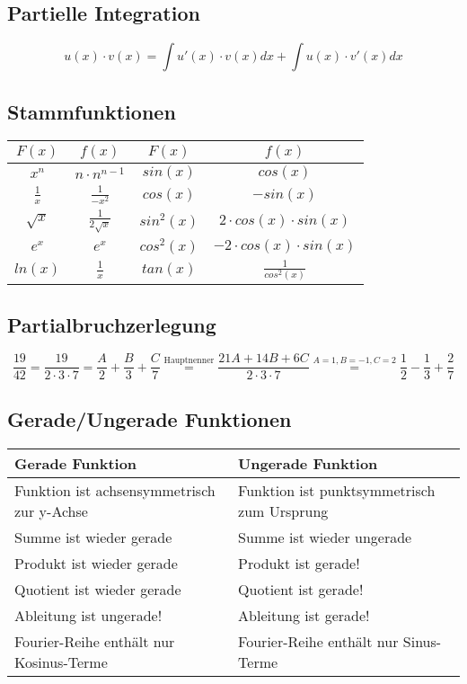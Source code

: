 \documentclass[12pt]{article}
\begin{document}
\subsection{Partielle Integration}
\begin{equation*}
	u(x)\cdot v(x) = \int u'(x) \cdot v(x) dx + \int u(x) \cdot v'(x) dx
\end{equation*}
\subsection{Stammfunktionen}
\begin{table}[H]
	\centering
	\begin{tabular}{|c|c||c|c|}
		\hline
		$F(x)$ & $f(x)$ & $F(x)$ & $f(x)$\\\hline\hline
		$x^n$ & $n\cdot n^{n-1}$ & $sin(x)$ & $cos(x)$\\\hline
		$\frac{1}{x}$ & $\frac{1}{-x^2}$ & $cos(x)$ & $-sin(x)$\\\hline
		$\sqrt{x}$ & $\frac{1}{2\sqrt{x}}$ & $sin^2(x)$ & $2\cdot cos(x)\cdot sin(x)$\\\hline
		$e^x$ & $e^x$ & $cos^2(x)$ & $-2\cdot cos(x)\cdot sin(x)$  \\\hline
		$ln(x)$ & $\frac{1}{x}$ & $tan(x)$ & $\frac{1}{cos^2(x)}$\\\hline
	\end{tabular}
\end{table}
\subsection{Partialbruchzerlegung}
\begin{equation*}
	\frac{19}{42}=\frac{19}{2\cdot3\cdot7}=\frac{A}{2}+\frac{B}{3}+\frac{C}{7}\stackrel{\text{Hauptnenner}}{=}\frac{21A+14B+6C}{2\cdot3\cdot7}\stackrel{A=1,B=-1,C=2}{=}\frac{1}{2}-\frac{1}{3}+\frac{2}{7}
\end{equation*}
\subsection{Gerade/Ungerade Funktionen}
\begin{table}[H]
	\centering
	\begin{tabular}{|l|l|}
		\hline
		\textbf{Gerade Funktion} & \textbf{Ungerade Funktion}\\
		\hline\hline
		Funktion ist achsensymmetrisch zur y-Achse & Funktion ist punktsymmetrisch zum Ursprung\\\hline
		Summe ist wieder gerade & Summe ist wieder ungerade \\\hline
		Produkt ist wieder gerade & Produkt ist gerade!\\\hline
		Quotient ist wieder gerade & Quotient ist gerade!\\\hline
		Ableitung ist ungerade! & Ableitung ist gerade!\\\hline
		Fourier-Reihe enthält nur Kosinus-Terme & Fourier-Reihe enthält nur Sinus-Terme\\\hline
	\end{tabular}
\end{table}
\end{document}
